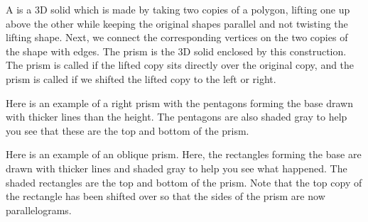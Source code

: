 \documentclass{ximera}
\begin{document}
\begin{definition}
A  is a 3D solid which is made by taking two copies of a polygon, lifting one up above the other while keeping the original shapes parallel and not twisting the lifting shape. Next, we connect the corresponding vertices on the two copies of the shape with edges. The prism is the 3D solid enclosed by this construction. The prism is called  if the lifted copy sits directly over the original copy, and the prism is called  if we shifted the lifted copy to the left or right.

Here is an example of a right prism with the pentagons forming the base drawn with thicker lines than the height. The pentagons are also shaded gray to help you see that these are the top and bottom of the prism.
\begin{center}
\end{center}

Here is an example of an oblique prism. Here, the rectangles forming the base are drawn with thicker lines and shaded gray to help you see what happened. The shaded rectangles are the top and bottom of the prism. Note that the top copy of the rectangle has been shifted over so that the sides of the prism are now parallelograms.
\begin{center}
\end{center}
\end{definition}
\end{document}
